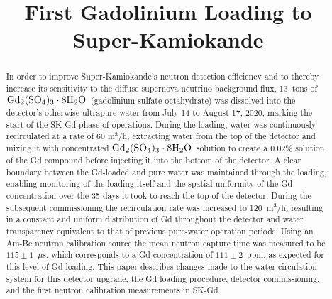 \documentclass[preprint,12pt]{elsarticle}
\newcommand{\GdSOw}{$\rm Gd_2(\rm SO_4)_3\cdot \rm 8H_2O$\ }
\begin{document}
\begin{frontmatter}


\title{First Gadolinium Loading to Super-Kamiokande}








\begin{abstract} %
In order to improve Super-Kamiokande's neutron detection efficiency and to thereby increase its sensitivity to the diffuse supernova neutrino background flux, 13~tons of \GdSOw (gadolinium sulfate octahydrate) was dissolved into the detector's otherwise ultrapure water from July 14 to August 17, 2020, marking the start of the SK-Gd phase of operations.
During the loading, water was continuously recirculated at a rate of 60 
m$^3$/h, extracting water from the top of the detector and mixing it with concentrated \GdSOw solution to create a 0.02\% solution of the Gd compound before injecting it into the bottom of the detector. 
A clear boundary between the Gd-loaded and pure water was maintained through the loading, enabling monitoring of the loading itself and the spatial uniformity of the Gd concentration over the 35 days it took to reach the top of the detector.
During the subsequent commissioning the recirculation rate was increased to 120~m$^3$/h, resulting in a constant and uniform distribution of Gd throughout the detector and water transparency equivalent to that of previous pure-water operation periods.
Using an Am-Be neutron calibration source the mean neutron capture time was measured to be $115\pm1$~$\mu$s, which corresponds to a Gd concentration of $111\pm2$~ppm, as expected for this level of Gd loading. 
This paper describes changes made to the water circulation system for this detector upgrade, the Gd loading procedure, detector commissioning, and the first neutron calibration measurements in SK-Gd.



\end{abstract}
\end{frontmatter}
\end{document}
